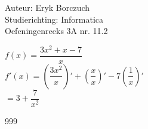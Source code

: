 \documentclass[a4paper]{article}
\begin{document}
  
\noindent \large Auteur: Eryk Borczuch \\
\noindent \large Studierichting: Informatica\\
\noindent \large Oefeningenreeks 3A nr. 11.2\\

\medskip

\normalsize

$ f(x) = \dfrac{3x^2 + x -7}{x}$\\

$f'(x) = \left(\dfrac{3x^2}{x}\right)' + \left(\dfrac{x}{x}\right)' -7\left(\dfrac{1}{x}\right)'$\\

$= 3 + \dfrac{7}{x^2}$

\begin{thebibliography}{999}
\end{thebibliography}
\end{document}
